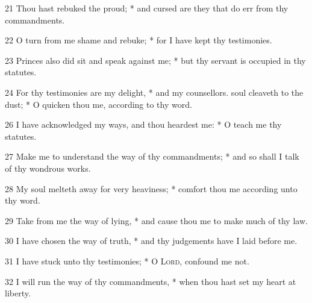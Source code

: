 21 Thou hast rebuked the proud; * and cursed are they that do err from thy commandments.\par
22 O turn from me shame and rebuke; * for I have kept thy testimonies.\par
23 Princes also did sit and speak against me; * but thy servant is occupied in thy statutes.\par
24 For thy testimonies are my delight, * and my counsellors.
 soul cleaveth to the dust; * O quicken thou me, according to thy word.\par
26 I have acknowledged my ways, and thou heardest me: * O teach me thy statutes.\par
27 Make me to understand the way of thy commandments; * and so shall I talk of thy wondrous works.\par
28 My soul melteth away for very heaviness; * comfort thou me according unto thy word.\par
29 Take from me the way of lying, * and cause thou me to make much of thy law.\par
30 I have chosen the way of truth, * and thy judgements have I laid before me.\par
31 I have stuck unto thy testimonies; * O {\textsc{Lord}}, confound me not.\par
32 I will run the way of thy commandments, * when thou hast set my heart at liberty.
